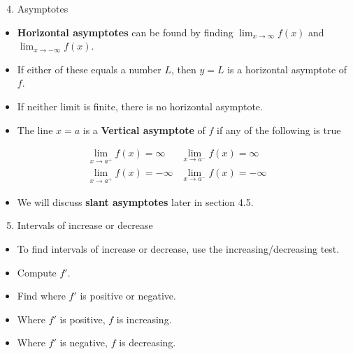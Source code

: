 \begin{frame}[t]
\begin{enumerate}
\setcounter{enumi}{3}
\item  Asymptotes
\end{enumerate}
\begin{itemize}
\item  \textbf{Horizontal asymptotes} can be found by finding $\lim_{x\to\infty} f(x)$ and $\lim_{x\to -\infty} f(x)$.
\item  If either of these equals a number $L$, then $y = L$ is a horizontal asymptote of $f$.  
\item  If neither limit is finite, there is no horizontal asymptote.
\item  The line $x = a$ is a \textbf{Vertical asymptote} of $f$ if any of the following is true
\end{itemize}
\[
\begin{array}{ll}
\displaystyle \lim_{x\to a^+}f(x) = \infty &%
\displaystyle \lim_{x\to a^-}f(x) = \infty \\%
\displaystyle \lim_{x\to a^+}f(x) = -\infty &%
\displaystyle \lim_{x\to a^-}f(x) = -\infty %
\end{array}
\]
\begin{itemize}
\item  We will discuss \textbf{slant asymptotes} later in section 4.5.
\end{itemize}
\end{frame}


\begin{frame}[t]
\begin{enumerate}
\setcounter{enumi}{4}
\item  Intervals of increase or decrease
\end{enumerate}
\begin{itemize}
\item  To find intervals of increase or decrease, use the increasing/decreasing test.
\item  Compute $f'$.
\item  Find where $f'$ is positive or negative.
\item  Where $f'$ is positive, $f$ is increasing.
\item  Where $f'$ is negative, $f$ is decreasing.
\end{itemize}
\end{frame}




